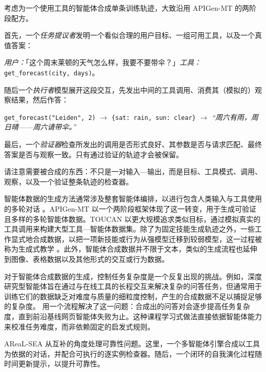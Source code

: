\begin{example}
考虑为一个使用工具的智能体合成单条训练轨迹，大致沿用 APIGen-MT \citep{NEURIPS2025_5e3661f7} 的两阶段配方。

首先，一个\emph{任务提议者}发明一个看似合理的用户目标、一组可用工具，以及一个真值答案：

\emph{用户：}「这个周末莱顿的天气怎么样，我要不要带伞？」\quad \emph{工具：} \texttt{get\_forecast(city, days)}。

随后一个\emph{执行者}模型展开这段交互，先发出中间的工具调用、消费其（模拟的）观察结果，然后作答：

\begin{center}\small
\texttt{get\_forecast("Leiden", 2)} $\rightarrow$ \texttt{\{sat: rain, sun: clear\}} $\rightarrow$ \emph{``周六有雨，周日晴——周六请带伞。''}
\end{center}

最后，一个\emph{验证器}检查所发出的调用是否形式良好、其参数是否与请求匹配、最终答案是否与观察一致。只有通过验证的轨迹才会被保留。

请注意需要被合成的东西：不只是一对输入—输出，而是目标、工具模式、调用、观察，以及一个验证整条轨迹的检查器。
\end{example}
智能体数据的生成方法通常涉及整套智能体编排，以进行包含人类输入与工具使用的多轮对话 \citep{wu2024autogen}。APIGen-MT \citep{NEURIPS2025_5e3661f7} 以一个两阶段框架体现了这一转变，用于生成可验证且多样的多轮智能体数据。TOUCAN \citep{xu2025toucansynthesizing15mtoolagentic} 以更大规模追求类似目标，通过模拟真实的工具调用来构建大型工具—智能体数据集。除了为固定技能生成轨迹之外，一些工作显式地合成数据，以把一项新技能或行为从强模型迁移到较弱模型，这一过程被称为生成式教学 \citep{crispino2023agent}。此外，智能体合成数据并不限于文本，类似的生成流程也延伸到图像、表格数据以及其他形式的交互或行为数据。

对于智能体合成数据的生成，控制任务复杂度是一个反复出现的挑战。例如，深度研究型智能体旨在通过与在线工具的长程交互来解决复杂的问答任务，但通常用于训练它们的数据缺乏对难度与质量的细粒度控制，产生的合成数据不足以捕捉足够的复杂度。\citet{pandit2025synthesizingagenticdataweb} 用一个流程解决了这一问题：合成出的问答对会逐步提高任务复杂度，直到前沿基线网页智能体失败为止。这种课程学习式做法直接依据智能体能力来校准任务难度，而非依赖固定的启发式规则。

AReaL-SEA \citep{gao2026selfevolvingsyntheticdataverifiablereward} 从互补的角度处理可靠性问题。这里，一个多智能体引擎合成以工具为依据的对话，并配合可执行的逐实例检查器。随后，一个闭环的自我演化过程随时间更新提示，以提升可靠性。



